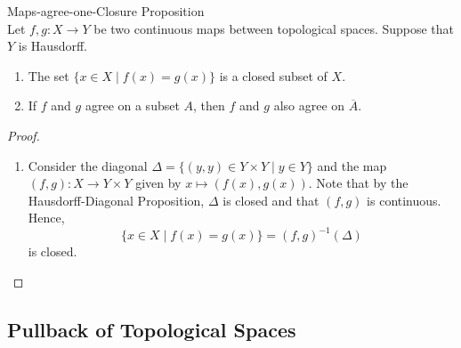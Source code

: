 \begin{corollary}{Maps-agree-one-Closure Proposition}\\
Let $f,g: X \to Y$ be two continuous maps between topological spaces. Suppose that $Y$ is Hausdorff.
\begin{enumerate}
    \item The set $\{ x \in X \mid f(x) =g(x) \}$ is a closed subset of $X$.
    \item If $f$ and $g$ agree on a subset $A$, then $f$ and $g$ also agree on $\overline{A}$.
\end{enumerate}
\end{corollary}

\begin{proof}
    \begin{enumerate}
        \item Consider the diagonal $\Delta = \{ (y,y) \in Y \times Y \mid y \in Y\}$ and the map $(f,g): X \to Y \times Y$ given by $x \mapsto (f(x) , g(x))$. Note that by the Hausdorff-Diagonal Proposition, $\Delta$ is closed and that $(f,g)$ is continuous. Hence,
        $$\{ x \in X \mid f(x) = g(x) \} = (f,g)^{-1} (\Delta)$$
        is closed.
    \end{enumerate}
\end{proof}

\subsection{Pullback of Topological Spaces}

